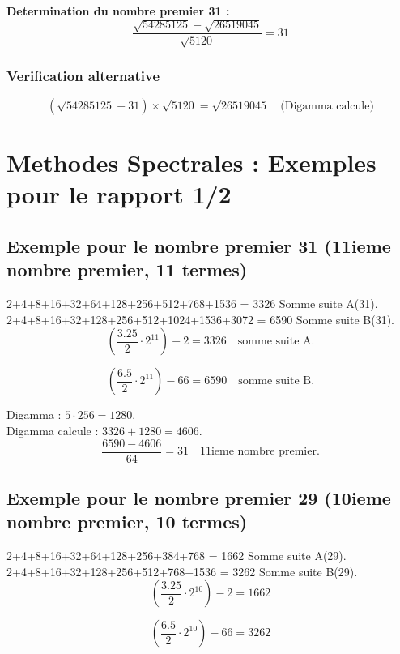 \documentclass[a4paper,11pt]{article}
\begin{document}
\textbf{Determination du nombre premier 31 :}
\[
\frac{\sqrt{54285125} - \sqrt{26519045}}{\sqrt{5120}} = 31
\]

\subsubsection{Verification alternative}
\[
(\sqrt{54285125} - 31) \times \sqrt{5120} = \sqrt{26519045} \quad \text{(Digamma calcule)}
\]

\section*{Methodes Spectrales : Exemples pour le rapport 1/2}

\subsection*{Exemple pour le nombre premier 31 (11ieme nombre premier, 11 termes)}

2+4+8+16+32+64+128+256+512+768+1536 = 3326 Somme suite A(31).\\
2+4+8+16+32+128+256+512+1024+1536+3072 = 6590 Somme suite B(31).\\

\[
\left(\frac{3.25}{2} \cdot 2^{11}\right) - 2 = 3326 \quad \text{somme suite A.}
\]

\[
\left(\frac{6.5}{2} \cdot 2^{11}\right) - 66 = 6590 \quad \text{somme suite B.}
\]

Digamma : \(5 \cdot 256 = 1280\).\\
Digamma calcule : \(3326 + 1280 = 4606\).\\

\[
\frac{6590 - 4606}{64} = 31 \quad \text{11ieme nombre premier.}
\]

\bigskip

\subsection*{Exemple pour le nombre premier 29 (10ieme nombre premier, 10 termes)}

2+4+8+16+32+64+128+256+384+768 = 1662 Somme suite A(29).\\
2+4+8+16+32+128+256+512+768+1536 = 3262 Somme suite B(29).\\

\[
\left(\frac{3.25}{2} \cdot 2^{10}\right) - 2 = 1662
\]

\[
\left(\frac{6.5}{2} \cdot 2^{10}\right) - 66 = 3262
\]
\end{document}
